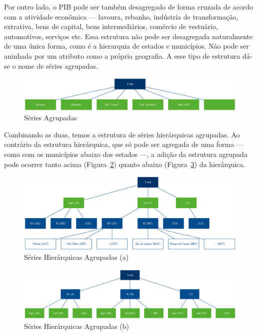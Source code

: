 \documentclass[
  12pt,
  oneside,
  a4paper,
  chapter=TITLE,
  section=TITLE,
  brazil]{abntex2}
\begin{document}
Por outro lado, o PIB pode ser também desagregado de forma cruzada de
acordo com a atividade econômica --- lavoura, rebanho, indústria de
transformação, extrativa, bens de capital, bens intermediários, comércio
de vestuário, automotivos, serviços etc. Essa estrutura não pode ser
desagregada naturalmente de uma única forma, como é a hierarquia de
estados e municípios. Não pode ser aninhada por um atributo como a
própria geografia. A esse tipo de estrutura dá-se o nome de séries
agrupadas.

\begin{figure}

{\centering \includegraphics{img/agrupadas.png}

}

\caption{\label{fig-a}Séries Agrupadas}

\end{figure}

Combinando as duas, temos a estrutura de séries hierárquicas agrupadas.
Ao contrário da estrutura hierárquica, que só pode ser agregada de uma
forma --- como com os municípios abaixo dos estados ---, a adição da
estrutura agrupada pode ocorrer tanto acima (Figura~\ref{fig-ha1})
quanto abaixo (Figura~\ref{fig-ha2}) da hierárquica.

\begin{figure}

{\centering \includegraphics{img/hier_agrup.png}

}

\caption{\label{fig-ha1}Séries Hierárquicas Agrupadas (a)}

\end{figure}

\begin{figure}

{\centering \includegraphics{img/hier_agrup_2.png}

}

\caption{\label{fig-ha2}Séries Hierárquicas Agrupadas (b)}

\end{figure}
\end{document}
